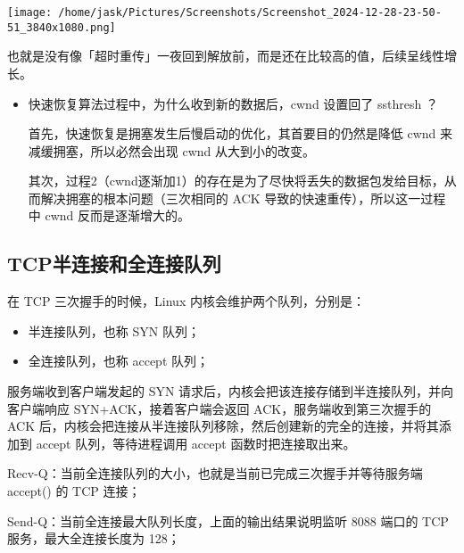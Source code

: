 \documentclass[11pt]{article}
\begin{document}
\begin{enumerate}
\begin{center}
\texttt{[image: /home/jask/Pictures/Screenshots/Screenshot\_2024-12-28-23-50-51\_3840x1080.png]}
\end{center}
也就是没有像「超时重传」一夜回到解放前，而是还在比较高的值，后续呈线性增长。

\begin{itemize}
\item 快速恢复算法过程中，为什么收到新的数据后，cwnd 设置回了 ssthresh ？

首先，快速恢复是拥塞发生后慢启动的优化，其首要目的仍然是降低 cwnd 来减缓拥塞，所以必然会出现 cwnd 从大到小的改变。

其次，过程2（cwnd逐渐加1）的存在是为了尽快将丢失的数据包发给目标，从而解决拥塞的根本问题（三次相同的 ACK 导致的快速重传），所以这一过程中 cwnd 反而是逐渐增大的。
\end{itemize}
\end{enumerate}
\subsection{TCP半连接和全连接队列}
\label{sec:org7bf543a}

在 TCP 三次握手的时候，Linux 内核会维护两个队列，分别是：

\begin{itemize}
\item 半连接队列，也称 SYN 队列；
\item 全连接队列，也称 accept 队列；
\end{itemize}

服务端收到客户端发起的 SYN 请求后，内核会把该连接存储到半连接队列，并向客户端响应 SYN+ACK，接着客户端会返回 ACK，服务端收到第三次握手的 ACK 后，内核会把连接从半连接队列移除，然后创建新的完全的连接，并将其添加到 accept 队列，等待进程调用 accept 函数时把连接取出来。

Recv-Q：当前全连接队列的大小，也就是当前已完成三次握手并等待服务端 accept() 的 TCP 连接；

Send-Q：当前全连接最大队列长度，上面的输出结果说明监听 8088 端口的 TCP 服务，最大全连接长度为 128；
\end{document}
